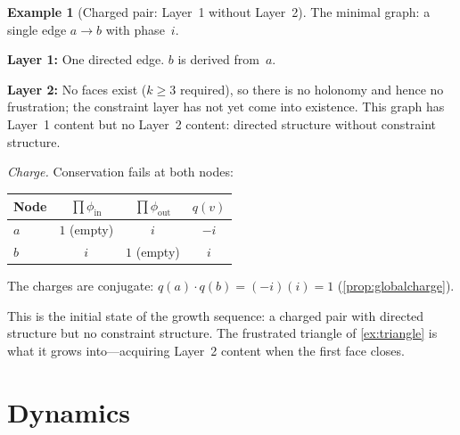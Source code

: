 \documentclass[11pt,a4paper]{article}
\theoremstyle{definition}
\newtheorem{example}[definition]{Example}
\theoremstyle{plain}
\theoremstyle{remark}
\newcommand{\inp}{\mathrm{in}}
\newcommand{\out}{\mathrm{out}}
\begin{document}
\begin{example}[Charged pair: Layer~1 without Layer~2]\label{ex:charged}
  The minimal graph: a single edge $a \to b$ with phase~$i$.

  \begin{center}
  \end{center}

  \noindent\textbf{Layer 1:}  One directed edge.  $b$ is derived from~$a$.

  \noindent\textbf{Layer 2:}  No faces exist ($k \geq 3$ required), so there is no holonomy and hence no frustration; the constraint layer has not yet come into existence.  This graph has Layer~1 content but no Layer~2 content: directed structure without constraint structure.

  \emph{Charge.}  Conservation fails at both nodes:
  \begin{center}
    \begin{tabular}{lccc}
      \toprule
      Node & $\prod \phi_{\inp}$ & $\prod \phi_{\out}$ & $q(v)$ \\
      \midrule
      $a$ & $1$ (empty) & $i$ & $-i$ \\
      $b$ & $i$ & $1$ (empty) & $i$ \\
      \bottomrule
    \end{tabular}
  \end{center}
  The charges are conjugate: $q(a) \cdot q(b) = (-i)(i) = 1$ (\cref{prop:globalcharge}).

  This is the initial state of the growth sequence: a charged pair with directed structure but no constraint structure.  The frustrated triangle of \cref{ex:triangle} is what it grows into---acquiring Layer~2 content when the first face closes.
\end{example}

\section{Dynamics}\label{sec:dynamics}
\end{document}
